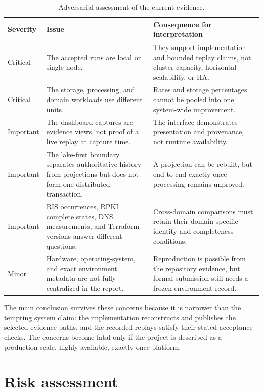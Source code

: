 \documentclass[a4paper,11pt]{article}
\begin{document}
\begin{table}[ht]
\centering
\caption{Adversarial assessment of the current evidence.}
\label{tab:critical-assessment}
\small
\begin{tabularx}{\textwidth}{@{}p{}p{}X@{}}
\toprule
Severity & Issue & Consequence for interpretation \\
\midrule
Critical & The accepted runs are local or single-node. & They support implementation and bounded replay claims, not cluster capacity, horizontal scalability, or HA. \\
Critical & The storage, processing, and domain workloads use different units. & Rates and storage percentages cannot be pooled into one system-wide improvement. \\
Important & The dashboard captures are evidence views, not proof of a live replay at capture time. & The interface demonstrates presentation and provenance, not runtime availability. \\
Important & The lake-first boundary separates authoritative history from projections but does not form one distributed transaction. & A projection can be rebuilt, but end-to-end exactly-once processing remains unproved. \\
Important & RIS occurrences, RPKI complete states, DNS measurements, and Terraform versions answer different questions. & Cross-domain comparisons must retain their domain-specific identity and completeness conditions. \\
Minor & Hardware, operating-system, and exact environment metadata are not fully centralized in the report. & Reproduction is possible from the repository evidence, but formal submission still needs a frozen environment record. \\
\bottomrule
\end{tabularx}
\end{table}

The main conclusion survives these concerns because it is narrower than the tempting system claim: the implementation reconstructs and publishes the selected evidence paths, and the recorded replays satisfy their stated acceptance checks. The concerns become fatal only if the project is described as a production-scale, highly available, exactly-once platform.

\section{Risk assessment}
\end{document}

